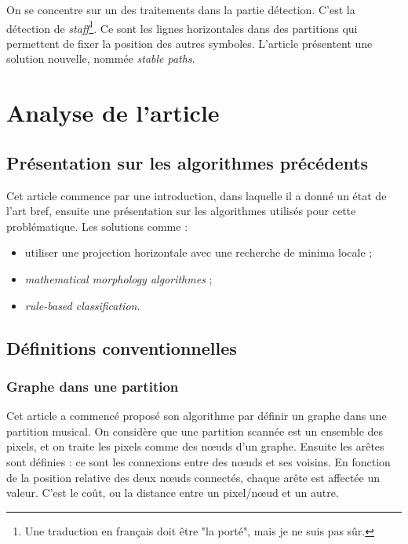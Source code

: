 \documentclass{article}
\begin{document}
On se concentre sur un des traitements dans la partie détection. C'est la détection de \textit{staff}\footnote{Une traduction en français doit être "la porté", mais je ne suis pas sûr.}. Ce sont les lignes horizontales dans des partitions qui permettent de fixer la position des autres symboles. L'article \cite{dos2009staff} présentent une solution nouvelle, nommée \textit{stable paths}.

\section{Analyse de l'article}
\subsection{Présentation sur les algorithmes précédents}
\par Cet article commence par une introduction, dans laquelle il a donné un état de l'art bref, ensuite une présentation sur les algorithmes utilisés pour cette problématique. Les solutions comme :
\begin{itemize}
    \item utiliser une projection horizontale avec une recherche de minima locale ;
    \item \textit{mathematical morphology algorithmes} ;
    \item \textit{rule-based classification}.
\end{itemize}
\subsection{Définitions conventionnelles}
\subsubsection{Graphe dans une partition}
\par Cet article a commencé proposé son algorithme par définir un graphe dans une partition musical. On considère que une partition scannée est un ensemble des pixels, et on traite les pixels comme des nœuds d'un graphe. Ensuite les arêtes sont définies : ce sont les connexions entre des nœuds et ses voisins. En fonction de la position relative des deux nœuds connectés, chaque arête est affectée un valeur. C'est le coût, ou la distance entre un pixel/nœud et un autre.
\end{document}
